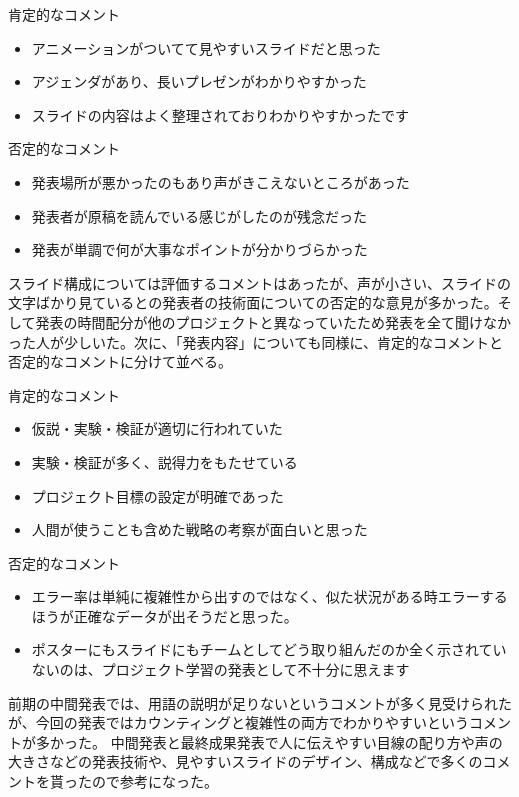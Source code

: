 肯定的なコメント
\begin{itemize}
\item アニメーションがついてて見やすいスライドだと思った
\item アジェンダがあり、長いプレゼンがわかりやすかった
\item スライドの内容はよく整理されておりわかりやすかったです
\end{itemize}

否定的なコメント
\begin{itemize}
\item 発表場所が悪かったのもあり声がきこえないところがあった
\item 発表者が原稿を読んでいる感じがしたのが残念だった
\item 発表が単調で何が大事なポイントが分かりづらかった
\end{itemize}

スライド構成については評価するコメントはあったが、声が小さい、スライドの文字ばかり見ているとの発表者の技術面についての否定的な意見が多かった。そして発表の時間配分が他のプロジェクトと異なっていたため発表を全て聞けなかった人が少しいた。次に、「発表内容」についても同様に、肯定的なコメントと否定的なコメントに分けて並べる。

肯定的なコメント
\begin{itemize}
\item 仮説・実験・検証が適切に行われていた
\item 実験・検証が多く、説得力をもたせている
\item プロジェクト目標の設定が明確であった
\item 人間が使うことも含めた戦略の考察が面白いと思った
\end{itemize}

否定的なコメント
\begin{itemize}
\item エラー率は単純に複雑性から出すのではなく、似た状況がある時エラーするほうが正確なデータが出そうだと思った。
\item ポスターにもスライドにもチームとしてどう取り組んだのか全く示されていないのは、プロジェクト学習の発表として不十分に思えます
\end{itemize}

前期の中間発表では、用語の説明が足りないというコメントが多く見受けられたが、今回の発表ではカウンティングと複雑性の両方でわかりやすいというコメントが多かった。
中間発表と最終成果発表で人に伝えやすい目線の配り方や声の大きさなどの発表技術や、見やすいスライドのデザイン、構成などで多くのコメントを貰ったので参考になった。

